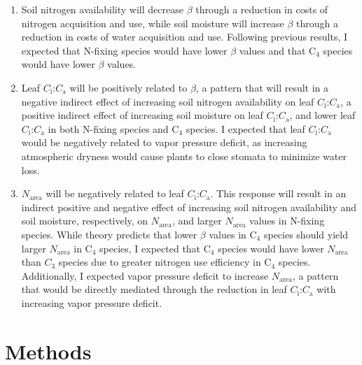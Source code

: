 \begin{enumerate}
    \item Soil nitrogen availability will decrease $\beta$ through a reduction in costs of nitrogen acquisition and use, while soil moisture will increase $\beta$ through a reduction in costs of water acquisition and use. Following previous results, I expected that N-fixing species would have lower $\beta$ values and that C$_4$ species would have lower $\beta$ values.
    
    \item Leaf $C_\mathrm{i}$:$C_\mathrm{a}$ will be positively related to $\beta$, a pattern that will result in a negative indirect effect of increasing soil nitrogen availability on leaf $C_\mathrm{i}$:$C_\mathrm{a}$, a positive indirect effect of increasing soil moisture on leaf $C_\mathrm{i}$:$C_\mathrm{a}$, and lower leaf $C_\mathrm{i}$:$C_\mathrm{a}$ in both N-fixing species and C$_4$ species. I expected that leaf $C_\mathrm{i}$:$C_\mathrm{a}$ would be negatively related to vapor pressure deficit, as increasing atmospheric dryness would cause plants to close stomata to minimize water loss.

    \item $N_\mathrm{area}$ will be negatively related to leaf $C_\mathrm{i}$:$C_\mathrm{a}$. This response will result in an indirect positive and negative effect of increasing soil nitrogen availability and soil moisture, respectively, on $N_\mathrm{area}$, and larger $N_\mathrm{area}$ values in N-fixing species. While theory predicts that lower $\beta$ values in C$_4$ species should yield larger $N_\mathrm{area}$ in C$_4$ species, I expected that C$_4$ species would have lower $N_\mathrm{area}$ than $C_3$ species due to greater nitrogen use efficiency in C$_4$ species. Additionally, I expected vapor pressure deficit to increase $N_\mathrm{area}$, a pattern that would be directly mediated through the reduction in leaf $C_\mathrm{i}$:$C_\mathrm{a}$ with increasing vapor pressure deficit.
\end{enumerate}

\section{Methods}
